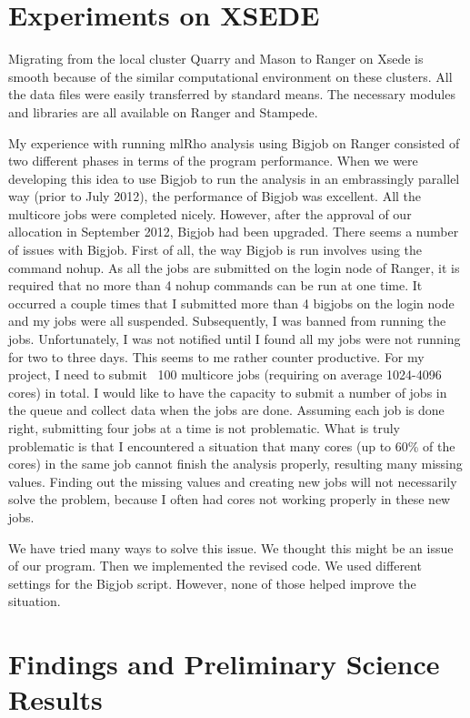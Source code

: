 \documentclass{sig-alternate}
\begin{document}
\section{Experiments on XSEDE}{\label{sec:experiments}
Migrating from the local cluster Quarry and Mason to Ranger on Xsede is smooth because of the similar computational environment on these clusters. All the data files were easily transferred by standard means. The necessary modules and libraries are all available on Ranger and Stampede.
 
My experience with running mlRho analysis using Bigjob on Ranger consisted of two different phases in terms of the program performance. When we were developing this idea to use Bigjob to run the analysis in an embrassingly parallel way (prior to July 2012), the performance of Bigjob was excellent. All the multicore jobs were completed nicely. However, after the approval of our allocation in September 2012, Bigjob had been upgraded. There seems a number of issues with Bigjob. First of all, the way Bigjob is run involves using the command nohup. As all the jobs are submitted on the login node of Ranger, it is required that no more than 4 nohup commands can be run at one time. It occurred a couple times that I submitted more than 4 bigjobs on the login node and my jobs were all suspended. Subsequently, I was banned from running the jobs. Unfortunately, I was not notified until I found all my jobs were not running for two to three days. This seems to me rather counter productive. For my project, I need to submit ~100 multicore jobs (requiring on average 1024-4096 cores) in total. I would like to have the capacity to submit a number of jobs in the queue and collect data when the jobs are done. Assuming each job is done right, submitting four jobs at a time is not problematic. What is truly problematic is that I encountered a situation that many cores (up to 60\% of the cores) in the same job cannot finish the analysis properly, resulting many missing values. Finding out the missing values and creating new jobs will not necessarily solve the problem, because I often had cores not working properly in these new jobs.
 
We have tried many ways to solve this issue. We thought this might be an issue of our program. Then we implemented the revised code. We used different settings for the Bigjob script. However, none of those helped improve the situation.

\section{Findings and Preliminary Science Results}\label{sec:results}

}
\end{document}
